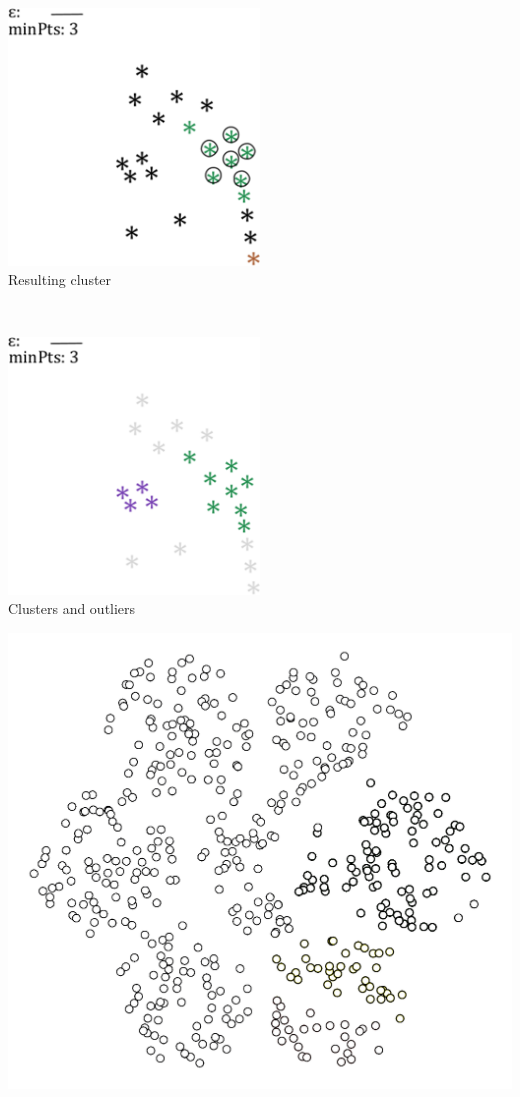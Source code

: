 \documentclass[20pt,landscape,footrule,headrule]{foils}
\begin{document}
{{\newpage\ 
\begin{center}
\includegraphics[width=0.5\textwidth]{Images/dbscan7} \\ Resulting cluster
\end{center}

\newpage\ 
\begin{center}
\includegraphics[width=0.5\textwidth]{Images/dbscan8} \\ Clusters and outliers
\end{center}

\newpage 
\begin{center}
\includegraphics[height=\textheight]{Images/clustering3}
\end{center}

}}
\end{document}
